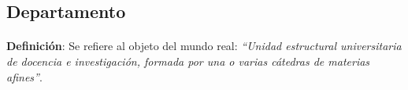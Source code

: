 \subsection{Departamento}

  \paragraph{}\textbf{Definición}: Se refiere al objeto del mundo real:
  \emph{``Unidad estructural universitaria de docencia e investigación, formada
  por una o varias cátedras de materias afines''}.




